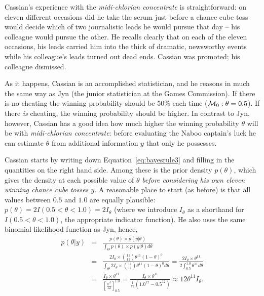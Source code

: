 Cassian's experience with the \emph{midi-chlorian concentrate} is straightforward: on eleven different occasions did he take the serum just before a chance cube toss would decide which of two journalistic leads he would pursue that day -- his colleague would pursue the other. He recalls clearly that on each of the eleven occasions, his leads carried him into the thick of dramatic, newsworthy events while his colleague's leads turned out dead ends. Cassian was promoted; his colleague dismissed.

As it happens, Cassian is an accomplished statistician, and he reasons in much the same way as Jyn (the junior statistician at the Games Commission). If there is no cheating the winning probability should be 50\% each time (${\cal M}_0: \theta = 0.5$). If there \emph{is} cheating, the winning probability should be higher. In contrast to Jyn, however, Cassian has a good idea how much higher the winning probability $\theta$ will be with \emph{midi-chlorian concentrate}: before evaluating the Naboo captain's luck he can estimate $\theta$ from additional information $y$ that only he possesses.

Cassian starts by writing down Equation~\ref{eq:bayesrule3} and filling in the quantities on the right hand side. Among these is the prior density $p(\theta)$, which gives the density at each possible value of $\theta$ \emph{before considering his own eleven winning chance cube tosses $y$}. A reasonable place to start (as before) is that all values between $0.5$ and $1.0$ are equally plausible: $p(\theta) = 2I(0.5<\theta<1.0) = 2I_\theta$ (where we introduce $I_\theta$ as a shorthand for $I(0.5<\theta<1.0)$, the appropriate indicator function). He also uses the same binomial likelihood function as Jyn, hence,
\begin{eqnarray*}
 p(\theta|y) &=& \frac{p(\theta) \times p(y|\theta)}{\int_{\Theta}p(\theta) \times p(y|\theta)d\theta}\\
             &=& \frac{2I_\theta \times \binom{11}{11}\theta^{11}(1-\theta)^0}{\int_{\Theta}2I_\theta \times \binom{11}{11}\theta^{11}(1-\theta)^0d\theta}
              = \frac{2I_\theta \times\theta^{11}}{2\int_{0.5}^{1.0} \theta^{11} d\theta}\\
             &=& \frac{I_\theta \times\theta^{11}}{\left[\frac{\theta^{12}}{12}\right]_{0.5}^{1.0}} = \frac{I_\theta \times\theta^{11}}{\frac{1}{12}\left(1.0^{12} - 0.5^{12}\right)}
         \approx 12\theta^{11}I_\theta.
\end{eqnarray*}

